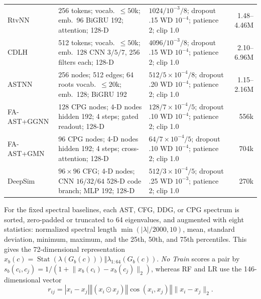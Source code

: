 \documentclass[final,5p,times,twocolumn]{elsarticle}
\newcommand{\concat}{\mathbin\Vert}
\theoremstyle{plain}
\begin{document}
\begin{table}[t]
\begin{tabularx}{\columnwidth}{@{}
p{}
p{}
X
r@{}}
RtvNN
&
\shortstack[l]{256 tokens; vocab.\ $\leq50$k; emb.\ 96\\
BiGRU 192; attention; 128-D}
&
\shortstack[l]{$1024/10^{-3}/8$; dropout .15\\
WD $10^{-4}$; patience 2; clip 1.0}
&
1.48--4.46M
\\

CDLH
&
\shortstack[l]{512 tokens; vocab.\ $\leq50$k; emb.\ 128\\
CNN $3/5/7$, 256 filters each; 128-D}
&
\shortstack[l]{$4096/10^{-3}/8$; dropout .15\\
WD $10^{-4}$; patience 2; clip 1.0}
&
2.10--6.96M
\\

ASTNN
&
\shortstack[l]{256 nodes; 512 edges; 64 roots\\
vocab.\ $\leq20$k; emb.\ 128; BiGRU 192}
&
\shortstack[l]{$512/5{\times}10^{-4}/8$; dropout .20\\
WD $10^{-4}$; patience 2; clip 1.0}
&
1.15--2.16M
\\

FA-AST+GGNN
&
\shortstack[l]{128 CPG nodes; 4-D nodes\\
hidden 192; 4 steps; gated readout; 128-D}
&
\shortstack[l]{$128/7{\times}10^{-4}/5$; dropout .10\\
WD $10^{-4}$; patience 2; clip 1.0}
&
556k
\\

FA-AST+GMN
&
\shortstack[l]{96 CPG nodes; 4-D nodes\\
hidden 192; 4 steps; cross-attention; 128-D}
&
\shortstack[l]{$64/7{\times}10^{-4}/5$; dropout .10\\
WD $10^{-4}$; patience 2; clip 1.0}
&
704k
\\

DeepSim
&
\shortstack[l]{$96{\times}96$ CFG; 4-D nodes; CNN $16/32/64$\\
528-D code branch; MLP 192; 128-D}
&
\shortstack[l]{$512/3{\times}10^{-4}/5$; dropout .25\\
WD $10^{-3}$; patience 2; clip 1.0}
&
270k
\\

\bottomrule
\end{tabularx}
\end{table}

For the fixed spectral baselines, each AST, CFG, DDG, or CPG spectrum is sorted, zero-padded or truncated to 64 eigenvalues, and augmented with eight statistics: normalized spectral length $\min(|\lambda|/2000,10)$, mean, standard deviation, minimum, maximum, and the 25th, 50th, and 75th percentiles. This gives the 72-dimensional representation $x_b(c)=
\operatorname{Stat}\!\left(\lambda(G_b(c))\right)
\concat
\lambda_{1:64}\!\left(G_b(c)\right)$.
\emph{No Train} scores a pair by
$s_b(c_i,c_j)=
1/(1+\lVert x_b(c_i)-x_b(c_j)\rVert_2)$,
whereas RF and LR use the 146-dimensional vector
\begin{equation}
r_{ij}
=
|x_i-x_j|
\concat(x_i\odot x_j)
\concat\cos(x_i,x_j)
\concat\lVert x_i-x_j\rVert_2.
\label{eq:revised_fixed_pair_features}
\end{equation}
\end{document}
